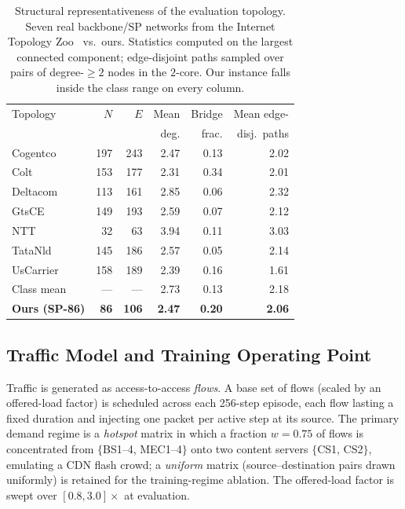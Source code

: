 \documentclass[10pt,journal,comsoc]{IEEEtran}
\begin{document}
\begin{table}[!t]
  \centering
  \caption{Structural representativeness of the evaluation topology. Seven real backbone/SP networks from the Internet Topology Zoo~\cite{knight2011internet} vs.\ ours. Statistics computed on the largest connected component; edge-disjoint paths sampled over pairs of degree-$\geq2$ nodes in the $2$-core. Our instance falls inside the class range on every column.}
  \label{tab:topo-zoo}
  \small
  \begin{tabular}{lrrrrr}
    \toprule
    Topology & $N$ & $E$ & Mean & Bridge & Mean edge- \\
             &     &     & deg. & frac. & disj.\ paths \\
    \midrule
    Cogentco   & 197 & 243 & 2.47 & 0.13 & 2.02 \\
    Colt       & 153 & 177 & 2.31 & 0.34 & 2.01 \\
    Deltacom   & 113 & 161 & 2.85 & 0.06 & 2.32 \\
    GtsCE      & 149 & 193 & 2.59 & 0.07 & 2.12 \\
    NTT        &  32 &  63 & 3.94 & 0.11 & 3.03 \\
    TataNld    & 145 & 186 & 2.57 & 0.05 & 2.14 \\
    UsCarrier  & 158 & 189 & 2.39 & 0.16 & 1.61 \\
    \midrule
    Class mean & --- & --- & 2.73 & 0.13 & 2.18 \\
    \textbf{Ours (SP-86)} & \textbf{86} & \textbf{106} & \textbf{2.47} & \textbf{0.20} & \textbf{2.06} \\
    \bottomrule
  \end{tabular}
\end{table}

\subsection{Traffic Model and Training Operating Point}
\label{subsec:traffic}
Traffic is generated as access-to-access \emph{flows}. A base set of flows (scaled by an offered-load factor) is scheduled across each 256-step episode, each flow lasting a fixed duration and injecting one packet per active step at its source. The primary demand regime is a \emph{hotspot} matrix in which a fraction $w=0.75$ of flows is concentrated from $\{$BS1--4, MEC1--4$\}$ onto two content servers $\{$CS1, CS2$\}$, emulating a CDN flash crowd; a \emph{uniform} matrix (source--destination pairs drawn uniformly) is retained for the training-regime ablation. The offered-load factor is swept over $[0.8, 3.0]\times$ at evaluation.
\end{document}
